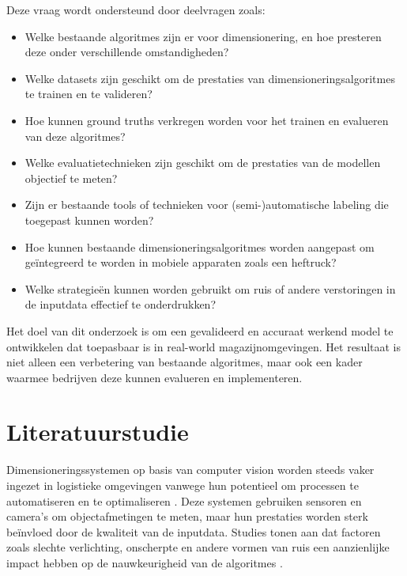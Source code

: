 Deze vraag wordt ondersteund door deelvragen zoals:
\begin{itemize}
    \item Welke bestaande algoritmes zijn er voor dimensionering, en hoe presteren deze onder verschillende omstandigheden?
    \item Welke datasets zijn geschikt om de prestaties van dimensioneringsalgoritmes te trainen en te valideren?
    \item Hoe kunnen ground truths verkregen worden voor het trainen en evalueren van deze algoritmes?
    \item Welke evaluatietechnieken zijn geschikt om de prestaties van de modellen objectief te meten?
    \item Zijn er bestaande tools of technieken voor (semi-)automatische labeling die toegepast kunnen worden?
    \item Hoe kunnen bestaande dimensioneringsalgoritmes worden aangepast om geïntegreerd te worden in mobiele apparaten zoals een heftruck?
    \item Welke strategieën kunnen worden gebruikt om ruis of andere verstoringen in de inputdata effectief te onderdrukken?

\end{itemize}

Het doel van dit onderzoek is om een gevalideerd en accuraat werkend model te ontwikkelen dat toepasbaar is in real-world magazijnomgevingen. Het resultaat is niet alleen een verbetering van bestaande algoritmes, maar ook een kader waarmee bedrijven deze kunnen evalueren en implementeren.


\section{Literatuurstudie}
\label{sec:literatuurstudie}

Dimensioneringssystemen op basis van computer vision worden steeds vaker ingezet in logistieke omgevingen vanwege hun potentieel om processen te automatiseren en te optimaliseren \autocite{getcameras2024}. Deze systemen gebruiken sensoren en camera’s om objectafmetingen te meten, maar hun prestaties worden sterk beïnvloed door de kwaliteit van de inputdata. Studies tonen aan dat factoren zoals slechte verlichting, onscherpte en andere vormen van ruis een aanzienlijke impact hebben op de nauwkeurigheid van de algoritmes \autocite{DeepCorrect2024}.

